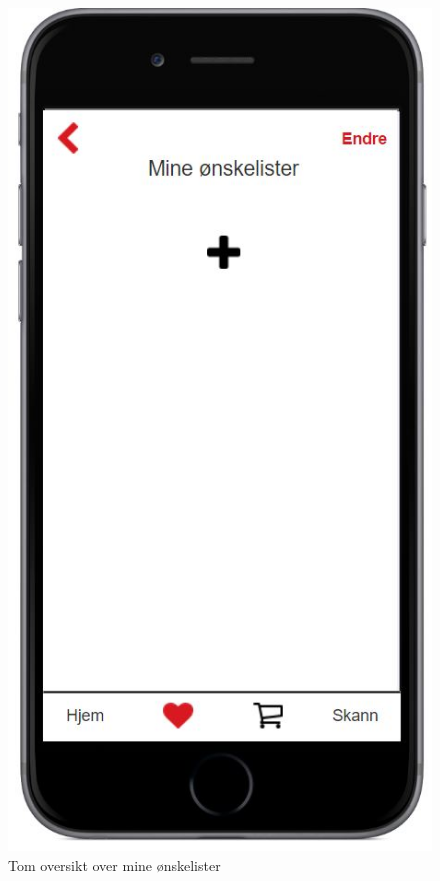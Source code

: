 \begin{figure}[H]
\includegraphics[scale=0.55]{images/axurebilder/mine_onskelister_tom}
\centering %
\caption{Tom oversikt over mine ønskelister}
\label{fig:mine_onskelister_tom}
\end{figure}

